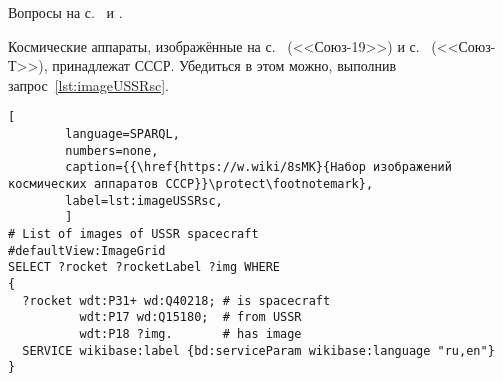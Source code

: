 \hfil{}\hfil%
\newpage

\begin{task}
    \label{answer:spacecraft_USSR}
    \AnswerBackref Вопросы на с.~\pageref{question:spacecraft_soyuz19} и 
    \pageref{question:spacecraft_soyuzT}.

    Космические аппараты, 
    изображённые на с.~\pageref{question:spacecraft_soyuz19} (<<Союз-19>>) и 
    с.~\pageref{question:spacecraft_soyuzT} (<<Союз-Т>>), принадлежат СССР. 
    Убедиться в этом можно, выполнив запрос~\ref{lst:imageUSSRsc}.

    \begin{lstlisting}[ 
        language=SPARQL, 
        numbers=none, 
        caption={{\href{https://w.wiki/8sMK}{Набор изображений космических аппаратов СССР}}\protect\footnotemark}, 
        label=lst:imageUSSRsc, 
        ]
# List of images of USSR spacecraft
#defaultView:ImageGrid
SELECT ?rocket ?rocketLabel ?img WHERE
{
  ?rocket wdt:P31+ wd:Q40218; # is spacecraft
          wdt:P17 wd:Q15180;  # from USSR
          wdt:P18 ?img.       # has image
  SERVICE wikibase:label {bd:serviceParam wikibase:language "ru,en"}
}
\end{lstlisting}
\end{task}



